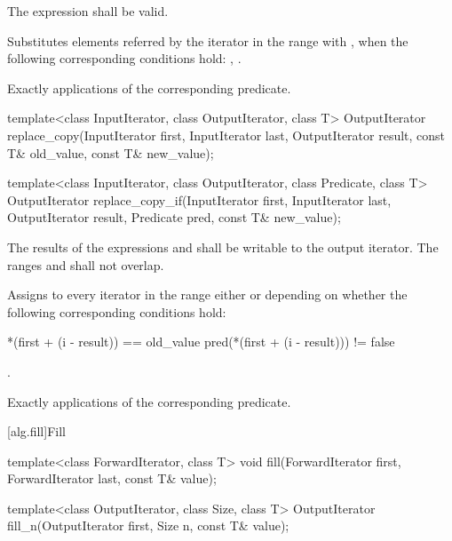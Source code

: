 \begin{itemdescr}
\pnum
\requires
The expression
shall be valid.

\pnum
\effects
Substitutes elements referred by the iterator
in the range 
with ,
when the following corresponding conditions hold:
, .

\pnum
\complexity
Exactly
applications of the corresponding predicate.
\end{itemdescr}

%
%
\begin{itemdecl}
template<class InputIterator, class OutputIterator, class T>
  OutputIterator
    replace_copy(InputIterator first, InputIterator last,
                 OutputIterator result,
                 const T& old_value, const T& new_value);

template<class InputIterator, class OutputIterator, class Predicate, class T>
  OutputIterator
    replace_copy_if(InputIterator first, InputIterator last,
                    OutputIterator result,
                    Predicate pred, const T& new_value);
\end{itemdecl}

\begin{itemdescr}
\pnum
\requires
The results of the expressions
and
shall be writable to the
output iterator.
The ranges
and
shall not overlap.

\pnum
\effects
Assigns to every iterator
in the
range
either
or
depending on whether the following corresponding conditions hold:

\begin{codeblock}
*(first + (i - result)) == old_value
pred(*(first + (i - result))) != false
\end{codeblock}

\pnum
\returns
{}.

\pnum
\complexity
Exactly
applications of the corresponding predicate.
\end{itemdescr}

[alg.fill]{Fill}

%
%
\begin{itemdecl}
template<class ForwardIterator, class T>
  void fill(ForwardIterator first, ForwardIterator last, const T& value);

template<class OutputIterator, class Size, class T>
  OutputIterator fill_n(OutputIterator first, Size n, const T& value);
\end{itemdecl}

